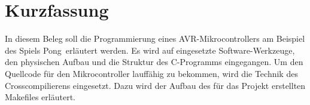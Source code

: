 
\section*{Kurzfassung}
In diesem Beleg soll die Programmierung eines AVR-Mikrocontrollers am Beispiel des Spiels \glqq Pong\grqq\ erläutert werden. Es wird auf eingesetzte Software-Werkzeuge, den physischen Aufbau und die Struktur des C-Programms eingegangen. Um den Quellcode für den Mikrocontroller lauffähig zu bekommen, wird die Technik des Crosscompilierens eingesetzt. Dazu wird der Aufbau des für das Projekt erstellten Makefiles erläutert.